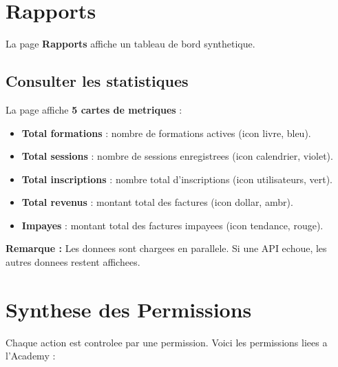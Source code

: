 \documentclass[a4paper,11pt]{article}
\newcommand{\remarque}[1]{\textcolor{warn}{\textbf{Remarque :} #1}}
\begin{document}
\section{Rapports}

La page \textbf{Rapports} affiche un tableau de bord synthetique.

\subsection{Consulter les statistiques}
La page affiche \textbf{5 cartes de metriques} :
\begin{itemize}
  \item \textbf{Total formations} : nombre de formations actives (icon livre, bleu).
  \item \textbf{Total sessions} : nombre de sessions enregistrees (icon calendrier, violet).
  \item \textbf{Total inscriptions} : nombre total d'inscriptions (icon utilisateurs, vert).
  \item \textbf{Total revenus} : montant total des factures (icon dollar, ambr).
  \item \textbf{Impayes} : montant total des factures impayees (icon tendance, rouge).
\end{itemize}

\remarque{Les donnees sont chargees en parallele. Si une API echoue, les autres donnees restent affichees.}


\section{Synthese des Permissions}

Chaque action est controlee par une permission. Voici les permissions liees a l'Academy :
\end{document}

